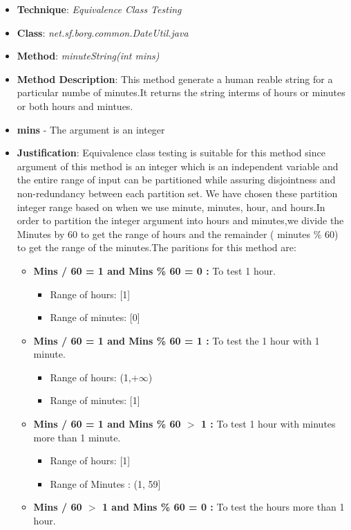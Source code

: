 \documentclass[fontsize=12pt,paper=letter,twoside]{scrartcl}
\begin{document}
\begin{itemize}
\item \textbf{Technique}: \emph{Equivalence Class Testing}
\item \textbf{Class}: \emph{net.sf.borg.common.DateUtil.java}
\item \textbf{Method}: \emph{minuteString(int mins)}
\item \textbf{Method Description}:
This method generate a human reable string for a particular numbe of minutes.It returns the string interms of hours or minutes or both hours and mintues.
\item \textbf{mins} - The argument is an integer
\item \textbf{Justification}: Equivalence class testing is suitable for this method since argument of this method is an integer which is an independent variable and the entire range of input can be partitioned while assuring disjointness and non-redundancy between each partition set. We have chosen these partition integer range based on when we use minute, minutes, hour, and hours.In order to partition the integer argument into hours and minutes,we divide the Minutes by 60 to get the range of hours and  the remainder ( minutes \% 60) to get the range of the minutes.The paritions for this method are:
 \begin{itemize}
\item \textbf{ Mins / 60 = 1 and Mins \% 60 = 0 :} To test 1 hour.
 \begin{itemize}
 \item Range of hours: [1]
 \item Range of minutes: [0]
\end{itemize}
\item \textbf{ Mins / 60 = 1 and Mins \% 60 = 1 :} To test the 1 hour with 1 minute.
 \begin{itemize}
 \item Range of hours: (1,$+\infty$)
 \item Range of minutes: [1]
\end{itemize}
\item \textbf{ Mins / 60 = 1 and Mins \% 60  $>$  1 :} To test 1 hour with minutes more than 1 minute. 
 \begin{itemize}
 \item  Range of hours: [1]
\item  Range of Minutes : (1, 59]
\newpage
\end{itemize}
\item \textbf{ Mins / 60 $>$ 1 and Mins \% 60 = 0 :} To test the hours more than 1 hour.

\end{itemize}
\end{itemize}
\end{document}
